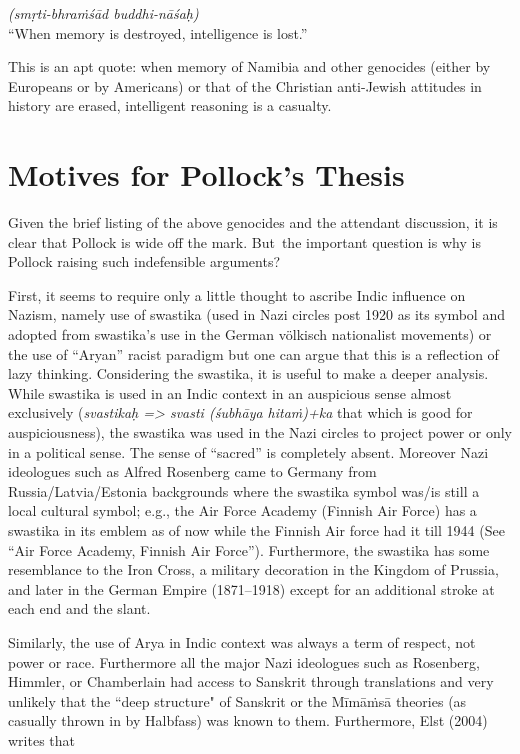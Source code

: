 \begin{myquote}
{\sl (smṛti-bhraṁśād buddhi-nāśaḥ)}\\
{\rm “When memory is destroyed, intelligence is lost.”}
\end{myquote}
This is an apt quote: when memory of Namibia and other genocides (either by Europeans or by Americans) or that of the Christian anti-Jewish attitudes in history are erased, intelligent reasoning is a casualty.

\section*{Motives for Pollock’s Thesis}
Given the brief listing of the above genocides and the attendant discussion, it is clear that Pollock is wide off the mark. But~the important question is why is Pollock raising such indefensible arguments?

First, it seems to require only a little thought to ascribe Indic influence on Nazism, namely use of swastika (used in Nazi circles post 1920 as its symbol and adopted from swastika's use in the German völkisch nationalist movements) or the use of “Aryan” racist paradigm but one can argue that this is a reflection of lazy thinking. Considering the swastika, it is useful to make a deeper analysis. While swastika is used in an Indic context in an auspicious sense almost exclusively ({\sl svastikaḥ => svasti (śubhāya hitaṁ)+ka} that which is good for auspiciousness), the swastika was used in the Nazi circles to project power or only in a political sense. The sense of “sacred” is completely absent. Moreover Nazi ideologues such as Alfred Rosenberg came to Germany from Russia/Latvia/Estonia backgrounds where the swastika symbol was/is still a local cultural symbol; e.g., the Air Force Academy (Finnish Air Force) has a swastika in its emblem as of now while the Finnish Air force had it till 1944 (See “Air Force Academy, Finnish Air Force”). Furthermore, the swastika has some resemblance to the Iron Cross, a military decoration in the Kingdom of Prussia, and later in the German Empire (1871–1918) except for an additional stroke at each end and the slant.

Similarly, the use of Arya in Indic context was always a term of respect, not power or race. Furthermore all the major Nazi ideologues such as Rosenberg, Himmler, or Chamberlain had access to Sanskrit through translations and very unlikely that the ``deep structure" of Sanskrit or the Mīmāṁsā theories (as casually thrown in by Halbfass) was known to them. Furthermore, Elst (2004) writes that 


